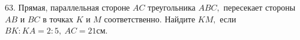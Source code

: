 63. Прямая, параллельная стороне $AC$ треугольника $ABC,$ пересекает стороны $AB$ и $BC$ в точках $K$ и $M$ соответственно. Найдите $KM,$ если $BK:KA=2:5,\ AC=21$см.\\
